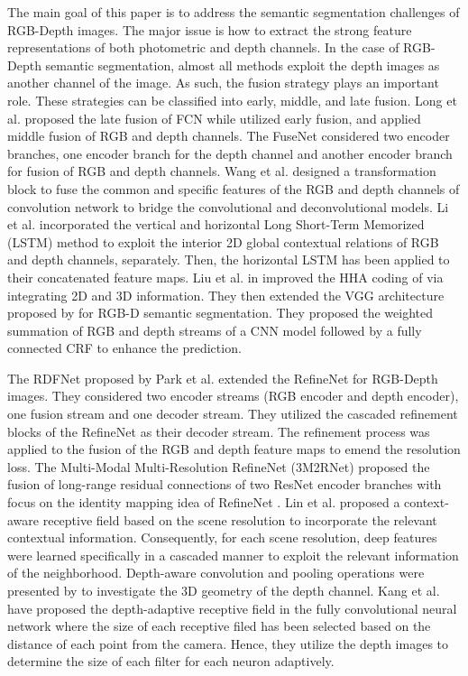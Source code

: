 \documentclass[journal,transmag]{IEEEtran}
\begin{document}
The main goal of this paper is to address the semantic segmentation challenges of RGB-Depth images. The major issue is how to extract the strong feature representations of both photometric and depth channels. In the case of RGB-Depth semantic segmentation, almost all methods exploit the depth images as another channel of the image. As such, the fusion strategy plays an important role.  These strategies can be classified into early, middle, and late fusion. Long et al. \cite{long2015fully_jo} proposed the late fusion of FCN while \cite{couprie2013indoor} utilized early fusion, and \cite{hazirbas2016fusenet} applied middle fusion of RGB and depth channels. The FuseNet \cite{hazirbas2016fusenet} considered two encoder branches, one encoder branch for the depth channel and another encoder branch for fusion of RGB and depth channels. Wang et al. \cite{wang2016learning} designed a transformation block to fuse the common and specific features of the RGB and depth channels of convolution network to bridge the convolutional and deconvolutional models. 
Li et al. \cite{li2016lstm} incorporated the vertical and horizontal Long Short-Term Memorized (LSTM) method to exploit the interior 2D global contextual relations of RGB and depth channels, separately. Then, the horizontal LSTM has been applied to their concatenated feature maps. Liu et al. in \cite{liu2018rgb} improved the HHA coding of \cite{gupta2014learning} via integrating 2D and 3D information. They then extended the VGG \cite{simonyan2014very} architecture proposed by \cite{chen2016deeplab} for RGB-D semantic segmentation. They proposed the weighted summation of RGB and depth streams of a CNN model followed by a fully connected CRF to enhance the prediction.

The RDFNet proposed by Park et al. \cite{park2017rdfnet} extended the RefineNet \cite{lin2017refinenet} for RGB-Depth images. They considered two encoder streams (RGB encoder and depth encoder), one fusion stream and one decoder stream. They utilized the cascaded refinement blocks of the RefineNet as their decoder stream. The refinement process was applied to the fusion of the RGB and depth feature maps to emend the resolution loss. The Multi-Modal Multi-Resolution RefineNet (3M2RNet) \cite{fooladgar20193m2rnet} proposed the fusion of long-range residual connections of two ResNet encoder branches with  focus on the identity mapping idea of RefineNet \cite{lin2017refinenet}. Lin et al. \cite{lin2017cascaded} proposed a context-aware receptive field based on the scene resolution to incorporate the relevant contextual information. Consequently, for each scene resolution, deep features were learned specifically in a cascaded manner to exploit the relevant information of the neighborhood. Depth-aware convolution and pooling operations were presented by  \cite{wang2018depth} to investigate the 3D geometry of the depth channel. Kang et al. \cite{kang2018depth} have proposed the depth-adaptive receptive field in the fully convolutional neural network where the size of each receptive filed has been selected based on the distance of each point from the camera. Hence, they utilize the depth images to determine the size of each filter for each neuron adaptively.
\end{document}
